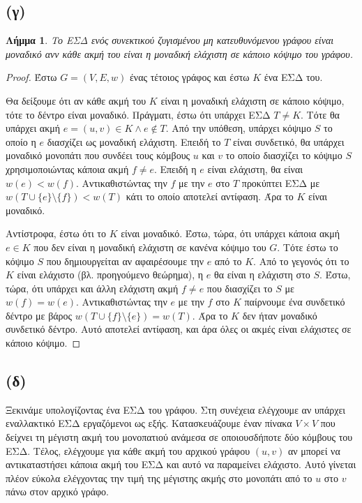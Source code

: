 \documentclass[11pt,a4paper,oneside]{report}
\newtheorem*{lemma}{Λήμμα}
\begin{document}
\subsection*{(γ)}
\begin{lemma}
Το ΕΣΔ ενός συνεκτικού ζυγισμένου μη κατευθυνόμενου γράφου είναι μοναδικό ανν κάθε ακμή του είναι η μοναδική ελάχιστη σε κάποιο κόψιμο του γράφου.
\end{lemma}

\begin{proof}
Έστω $G = (V, E, w)$ ένας τέτοιος γράφος και έστω $K$ ένα ΕΣΔ του.

Θα δείξουμε ότι αν κάθε ακμή του $K$ είναι η μοναδική ελάχιστη σε κάποιο κόψιμο, τότε το δέντρο είναι μοναδικό. Πράγματι, έστω ότι υπάρχει ΕΣΔ $T \neq K$. Τότε θα υπάρχει ακμή $e = (u, v) \in K \land e \not\in T$. Από την υπόθεση, υπάρχει κόψιμο $S$ το οποίο η $e$ διασχίζει ως μοναδική ελάχιστη. Επειδή το $T$ είναι συνδετικό, θα υπάρχει μοναδικό μονοπάτι που συνδέει τους κόμβους $u$ και $v$ το οποίο διασχίζει το κόψιμο $S$ χρησιμοποιώντας κάποια ακμή $f \neq e$. Επειδή η $e$ είναι ελάχιστη, θα είναι $w(e) < w(f)$. Αντικαθιστώντας την $f$ με την $e$ στο $T$ προκύπτει ΕΣΔ με $w( T \cup \{ e \} \setminus \{ f \} ) < w( T )$ κάτι το οποίο αποτελεί αντίφαση. Άρα το $K$ είναι μοναδικό.

Αντίστροφα, έστω ότι το $K$ είναι μοναδικό. Έστω, τώρα, ότι υπάρχει κάποια ακμή $e \in K$ που δεν είναι η μοναδική ελάχιστη σε κανένα κόψιμο του $G$. Τότε έστω το κόψιμο $S$ που δημιουργείται αν αφαιρέσουμε την $e$ από το $K$. Από το γεγονός ότι το $K$ είναι ελάχιστο (βλ. προηγούμενο θεώρημα), η $e$ θα είναι η ελάχιστη στο $S$. Έστω, τώρα, ότι υπάρχει και άλλη ελάχιστη ακμή $f \neq e$ που διασχίζει το $S$ με $w( f ) = w( e )$. Αντικαθιστώντας την $e$ με την $f$ στο $K$ παίρνουμε ένα συνδετικό δέντρο με βάρος $w( T \cup \{ f \} \setminus \{ e \} ) = w( T )$. Άρα το $K$ δεν ήταν μοναδικό συνδετικό δέντρο. Αυτό αποτελεί αντίφαση, και άρα όλες οι ακμές είναι ελάχιστες σε κάποιο κόψιμο.
\end{proof}

\subsection*{(δ)}
Ξεκινάμε υπολογίζοντας ένα ΕΣΔ του γράφου. Στη συνέχεια ελέγχουμε αν υπάρχει εναλλακτικό ΕΣΔ εργαζόμενοι ως εξής. Κατασκευάζουμε έναν πίνακα $V \times V$ που δείχνει τη μέγιστη ακμή του μονοπατιού ανάμεσα σε οποιουσδήποτε δύο κόμβους του ΕΣΔ. Τέλος, ελέγχουμε για κάθε ακμή του αρχικού γράφου $(u, v)$ αν μπορεί να αντικαταστήσει κάποια ακμή του ΕΣΔ και αυτό να παραμείνει ελάχιστο. Αυτό γίνεται πλέον εύκολα ελέγχοντας την τιμή της μέγιστης ακμής στο μονοπάτι από το $u$ στο $v$ πάνω στον αρχικό γράφο.
\end{document}

